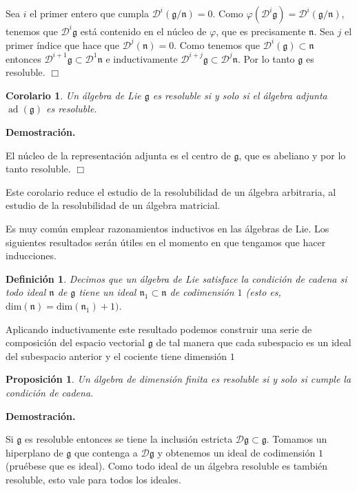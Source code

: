 \documentclass[a4paper,draft,12pt]{scrartcl}
\newtheorem{defi}{Definición}[section]%
\newtheorem{propo}[teo]{Proposición}%
\newtheorem{cor}[teo]{Corolario}%
\newcommand{\dem}{\noindent \textbf{Demostración. }\vspace{0.3 cm}}%
\newcommand{\g}{\mathfrak{g}}%
\newcommand{\fin}{ $\Box $ \vspace{0.4 cm}}
\newcommand{\D}{\mathcal{D}}%
\newcommand{\df}[1]{\textsf{\color{blue}#1}}
\DeclareMathOperator{\ad}{ad}  %
\begin{document}
Sea $i$ el primer entero que cumpla $\D^i(\g/\mathfrak{n})=0$.  Como $\varphi(\D^i\g)= \D^i(\g/\mathfrak{n})$, tenemos que $\D^i\g$ está contenido en el núcleo de $\varphi$, que es precisamente $\mathfrak{n}$.  Sea $j$ el primer índice que hace que $\D^j(\mathfrak{n})=0$.  Como tenemos que $\D^i(\g) \subset \mathfrak{n}$ entonces $\D^{i+1}\g \subset \D^1\mathfrak{n}$ e inductivamente $\D^{i+j}\g \subset \D^j\mathfrak{n}$.  Por lo tanto $\g$ es resoluble.  \fin

\begin{cor}

Un álgebra de Lie $\g$ es resoluble si y solo si el álgebra adjunta $\ad(\g)$ es resoluble.

\end{cor}

\dem

El núcleo de la representación adjunta es el centro de $\g$, que es abeliano y por lo tanto resoluble.  \fin

Este corolario reduce el estudio de la resolubilidad de un álgebra arbitraria, al estudio de la resolubilidad de un álgebra matricial. 



Es muy común emplear razonamientos inductivos en las álgebras de Lie. Los siguientes resultados serán útiles en el momento en que tengamos que hacer inducciones.




\begin{defi}

Decimos que un álgebra de Lie satisface la  \df{condición de cadena}  si todo ideal $\mathfrak{n}$ de $\g$ tiene un ideal $\mathfrak{n}_1 \subset \mathfrak{n}$ de codimensión $1$ (esto es, $\mathrm{dim}(\mathfrak{n}) = \mathrm{dim}(\mathfrak{n}_1)+1)$.

\end{defi}

Aplicando inductivamente este resultado podemos construir una serie de composición del espacio vectorial $\g$ de tal manera que cada subespacio es un ideal del subespacio anterior y el cociente tiene dimensión $1$
\begin{propo}

Un álgebra de dimensión finita es resoluble si y solo si cumple la condición de cadena.

\end{propo}

\dem

Si $\g$ es resoluble entonces se tiene la inclusión estricta $\D\g \subset \g$.  Tomamos un hiperplano de $\g$ que contenga a $\D\g$ y obtenemos un ideal de codimensión $1$ (pruébese que es ideal).  Como todo ideal de un álgebra resoluble es también resoluble, esto vale para todos los ideales.
\end{document}
